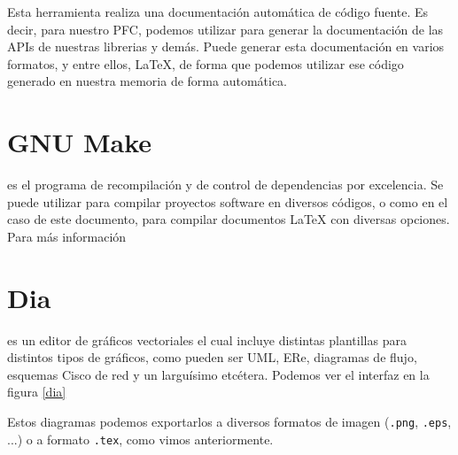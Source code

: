 Esta herramienta realiza una documentación automática de código
fuente. Es decir, para nuestro PFC, podemos utilizar para generar la
documentación de las APIs de nuestras librerias y demás. Puede generar
esta documentación en varios formatos, y entre ellos, \LaTeX, de forma
que podemos utilizar ese código generado en nuestra memoria de forma
automática.

\section*{GNU Make}

 es el programa de recompilación y de control de
dependencias por excelencia. Se puede utilizar para compilar proyectos
software en diversos códigos, o como en el caso de este documento,
para compilar documentos \LaTeX{} con diversas opciones.\\

Para más información \cite{pdf:make}

\section*{Dia}

 es un editor de gráficos vectoriales el cual incluye
distintas plantillas para distintos tipos de gráficos, como pueden ser
UML, ERe, diagramas de flujo, esquemas Cisco de red y un larguísimo
etcétera. Podemos ver el interfaz en la figura \ref{dia}


Estos diagramas podemos exportarlos a diversos formatos de imagen
(\texttt{.png}, \texttt{.eps}, ...) o a formato \texttt{.tex}, como
vimos anteriormente.